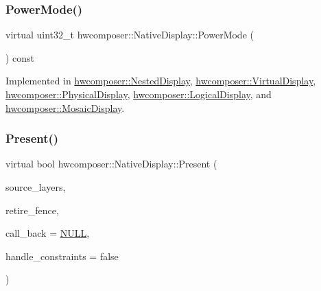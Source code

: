 \subsubsection{\texorpdfstring{Power\+Mode()}{PowerMode()}}
{\footnotesize\ttfamily virtual uint32\+\_\+t hwcomposer\+::\+Native\+Display\+::\+Power\+Mode (\begin{DoxyParamCaption}{ }\end{DoxyParamCaption}) const\hspace{0.3cm}{\ttfamily [pure virtual]}}



Implemented in \mbox{\hyperlink{classhwcomposer_1_1NestedDisplay_a7f08b439ab7e67ba6344471b9efe7d62}{hwcomposer\+::\+Nested\+Display}}, \mbox{\hyperlink{classhwcomposer_1_1VirtualDisplay_a81f29d5b1642bb5f9dfc84fdfc497e8a}{hwcomposer\+::\+Virtual\+Display}}, \mbox{\hyperlink{classhwcomposer_1_1PhysicalDisplay_a8339a14dbaa5ac9a1d4d4c3dc3694a10}{hwcomposer\+::\+Physical\+Display}}, \mbox{\hyperlink{classhwcomposer_1_1LogicalDisplay_af0fd1b1d9b574403e9c4680f7b371c21}{hwcomposer\+::\+Logical\+Display}}, and \mbox{\hyperlink{classhwcomposer_1_1MosaicDisplay_a41e94410e4e73ee057ef672bb51aba65}{hwcomposer\+::\+Mosaic\+Display}}.

\mbox{\label{classhwcomposer_1_1NativeDisplay_a4825b8bc4b85e03b396ed6d2cf5bd8c0}} 
\subsubsection{\texorpdfstring{Present()}{Present()}}
{\footnotesize\ttfamily virtual bool hwcomposer\+::\+Native\+Display\+::\+Present (\begin{DoxyParamCaption}\item[{std\+::vector$<$ \mbox{\hyperlink{structhwcomposer_1_1HwcLayer}{Hwc\+Layer}} $\ast$$>$ \&}]{source\+\_\+layers,  }\item[{int32\+\_\+t $\ast$}]{retire\+\_\+fence,  }\item[{\mbox{\hyperlink{classhwcomposer_1_1PixelUploaderCallback}{Pixel\+Uploader\+Callback}} $\ast$}]{call\+\_\+back = {\ttfamily \mbox{\hyperlink{alios_2platformdefines_8h_a070d2ce7b6bb7e5c05602aa8c308d0c4}{N\+U\+LL}}},  }\item[{bool}]{handle\+\_\+constraints = {\ttfamily false} }\end{DoxyParamCaption})\hspace{0.3cm}{\ttfamily [pure virtual]}}

